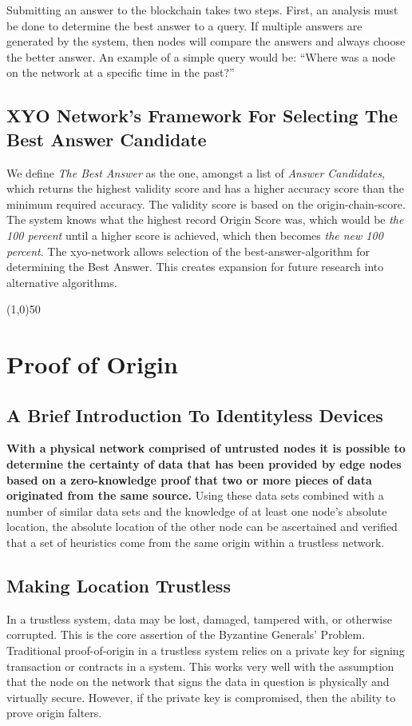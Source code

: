 \documentclass{article}
\begin{document}
Submitting an answer to the blockchain takes two steps. First, an analysis must be done to determine the best answer to a query. If multiple answers are generated by the system, then nodes will compare the answers and always choose the better answer. An example of a simple query would be: ``Where was a node on the network at a specific time in the past?''

\subsection {XYO Network's Framework For Selecting The Best Answer Candidate}
We define \textit{The Best Answer} as the one, amongst a list of \textit{Answer Candidates}, which returns the highest validity score and has a higher \gls{accuracy} score than the minimum required accuracy. The validity score is based on the \Gls{origin-chain-score}. The system knows what the highest record Origin Score was, which would be \textit{the 100 percent} until a higher score is achieved, which then becomes \textit{the new 100 percent}. The \Gls{xyo-network} allows selection of the \Gls{best-answer-algorithm} for determining the Best Answer. This creates expansion for future research into alternative algorithms.
\begin{center}
\line(1,0){50}
\end{center}


\section {Proof of Origin}


\subsection {A Brief Introduction To Identityless Devices}
\textbf{With a physical network comprised of untrusted nodes it is possible to determine the \gls{certainty} of data that has been provided by edge nodes based on a zero-knowledge proof that two or more pieces of data originated from the same source.} Using these data sets combined with a number of similar data sets and the knowledge of at least one node's absolute location, the absolute location of the other node can be ascertained and verified that a set of \glspl{heuristic} come from the same origin within a trustless network.

\subsection {Making Location Trustless}
In a trustless system, data may be lost, damaged, tampered with, or otherwise corrupted. This is the core assertion of the Byzantine Generals' Problem. Traditional \Gls{proof-of-origin} in a trustless system relies on a private key for signing transaction or contracts in a system. This works very well with the assumption that the node on the network that signs the data in question is physically and virtually secure. However, if the private key is compromised, then the ability to prove origin falters.
\end{document}
